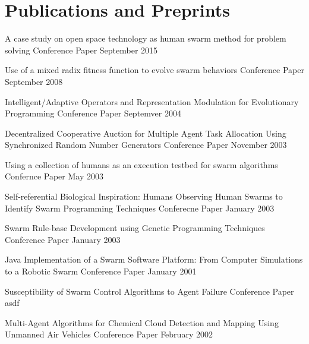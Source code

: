 \documentclass{cv_style}
\begin{document}
	\section{Publications and Preprints}
		\begin{etaremune}			
			\item \paper
				{A case study on open space technology as human swarm method for problem solving}
				{Conference Paper}
				{September 2015}

			\item \paper
				{Use of a mixed radix fitness function to evolve swarm behaviors}
				{Conference Paper}
				{September 2008}

			\item \paper
				{Intelligent/Adaptive Operators and Representation Modulation for Evolutionary Programming}
				{Conference Paper}
				{Septemver 2004}
			
			\item \paper
				{Decentralized Cooperative Auction for Multiple Agent Task Allocation Using Synchronized Random Number Generators}
				{Conference Paper}
				{November 2003}

			\item \paper
				{Using a collection of humans as an execution testbed for swarm algorithms}
				{Confernce Paper}
				{May 2003}

			\item \paper
				{Self-referential Biological Inspiration: Humans Observing Human Swarms to Identify Swarm Programming Techniques}
				{Conferecne Paper}
				{January 2003}

			\item \paper
				{Swarm Rule-base Development using Genetic Programming Techniques}
				{Conference Paper}
				{January 2003}

			\item \paper
				{Java Implementation of a Swarm Software Platform: From Computer Simulations to a Robotic Swarm}
				{Conference Paper}
				{January 2001}

			\item \paper
				{Susceptibility of Swarm Control Algorithms to Agent Failure}
				{Conference Paper}
				{asdf}

			\item \paper
				{Multi-Agent Algorithms for Chemical Cloud Detection and Mapping Using Unmanned Air Vehicles}
				{Conference Paper}
				{February 2002}
			
		\end{etaremune}
		
\end{document}
